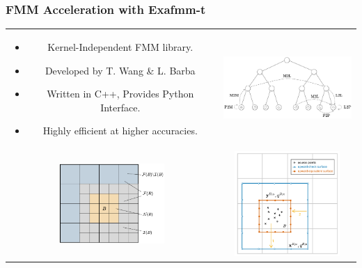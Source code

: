 \documentclass[dvipsnames,10pt]{beamer}
\begin{document}
\begin{frame}
	\frametitle{FMM Acceleration with Exafmm-t}
	\vspace{-.1cm}
	\begin{center}
		\begin{tabular}{cc}
			\begin{minipage}{5cm}
				\begin{itemize}
					\item Kernel-Independent FMM library.
					\item Developed by T. Wang \& L. Barba
					\item Written in C++, Provides Python Interface.
					\item Highly efficient at higher accuracies.
				\end{itemize}
			\end{minipage} &
			\includegraphics[width=5cm]{../figs/fmm_sketch.pdf} \\
			\includegraphics[width=4cm]{../figs/near_far_decomposition.pdf} &
			\includegraphics[width=4cm]{../figs/multipole_expansion.pdf}
		\end{tabular}
	\end{center}
	
\end{frame}
\end{document}
